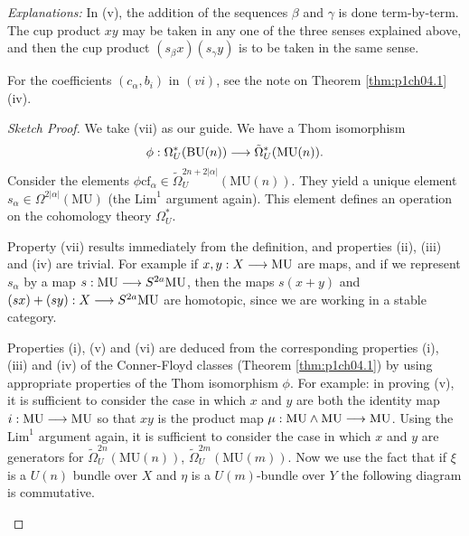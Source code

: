\documentclass[../main]{subfiles}
\begin{document}
\emph{Explanations:} In (v), the addition of the sequences $\beta$ and $\gamma$ is done term-by-term. The cup product $xy$ may be taken in any one of the three senses explained above, and then the cup product $(s_\beta x)(s_\gamma y)$ is to be taken in the same sense.

For the coefficients $(c_\alpha, b_i)$ in $(vi)$, see the note on Theorem \ref{thm:p1ch04.1}(iv).

\begin{proof}[Sketch Proof]
We take (vii) as our guide. We have a Thom isomorphism $$\phi : \Omega_U^\ast(\mathrm{BU}(n)) \overset{}{\longrightarrow} \tilde \Omega_U^\ast(\mathrm{MU}(n)).$$ Consider the elements $\phi \mathrm{cf}_\alpha \in \tilde \Omega_U^{2n + 2|\alpha|}(\mathrm{MU}(n)).$ They yield a unique element $s_\alpha \in \Omega^{2|\alpha|}(\mathrm{MU})$ (the $\mathrm{Lim}^1$ argument again). This element defines an operation on the cohomology theory $\Omega_U^\ast.$

Property (vii) results immediately from the definition, and properties (ii), (iii) and (iv) are trivial. For example if $x, y : X \overset{}{\longrightarrow} \mathrm{MU}$ are maps, and if we represent $s_\alpha$ by a map $s : \mathrm{MU} \overset{}{\longrightarrow} S^{2a}\mathrm{MU}$, then the maps $s(x + y)$ and $(sx)+(sy) : X \overset{}{\longrightarrow} S^{2a} \mathrm{MU}$ are homotopic, since we are working in a stable category.

Properties (i), (v) and (vi) are deduced from the corresponding properties (i), (iii) and (iv) of the Conner-Floyd classes (Theorem \ref{thm:p1ch04.1}) by using appropriate properties of the Thom isomorphism $\phi$. For example: in proving (v), it is sufficient to consider the case in which $x$ and $y$  are both the identity map $i : \mathrm{MU} \overset{}{\longrightarrow} \mathrm{MU}$ so that $x y$ is the product map $\mu : \mathrm{MU} \wedge \mathrm{MU} \overset{}{\longrightarrow} \mathrm{MU}$. Using the $\mathrm{Lim}^1$ argument again, it is sufficient to consider the case in which $x$ and $y$ are generators for ${\tilde \Omega}_U^{2n}(\mathrm{MU}(n))$, ${\tilde \Omega}_U^{2m}(\mathrm{MU}(m))$. Now we use the fact that if $\xi$ is a $U(n)$ bundle over $X$ and $\eta$ is a $U(m)$-bundle over $Y$ the following diagram is commutative. 

\begin{center}
\end{center}


\end{proof}
\end{document}
